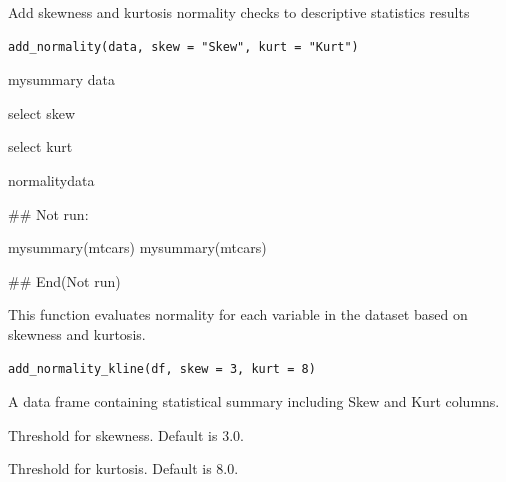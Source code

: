 \documentclass[a4paper]{book}
\begin{document}
%
\begin{Description}
Add skewness and kurtosis normality checks to descriptive statistics results
\end{Description}
%
\begin{Usage}
\begin{verbatim}
add_normality(data, skew = "Skew", kurt = "Kurt")
\end{verbatim}
\end{Usage}
%
\begin{Arguments}
\begin{ldescription}
\item[\code{data}] mysummary data

\item[\code{skew}] select skew

\item[\code{kurt}] select kurt
\end{ldescription}
\end{Arguments}
%
\begin{Value}
normalitydata
\end{Value}
%
\begin{Examples}
\begin{ExampleCode}

\#\# Not run: 

mysummary(mtcars)
mysummary(mtcars)%



## End(Not run)

\end{ExampleCode}
\end{Examples}
%
\begin{Description}
This function evaluates normality for each variable in the dataset based on skewness and kurtosis.
\end{Description}
%
\begin{Usage}
\begin{verbatim}
add_normality_kline(df, skew = 3, kurt = 8)
\end{verbatim}
\end{Usage}
%
\begin{Arguments}
\begin{ldescription}
\item[\code{df}] A data frame containing statistical summary including Skew and Kurt columns.

\item[\code{skew}] Threshold for skewness. Default is 3.0.

\item[\code{kurt}] Threshold for kurtosis. Default is 8.0.
\end{ldescription}
\end{Arguments}
\end{document}
